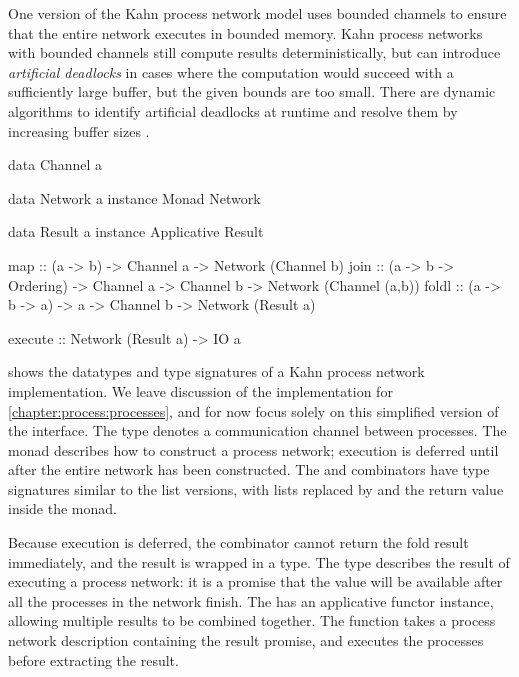 One version of the Kahn process network model uses bounded channels to ensure that the entire network executes in bounded memory.
Kahn process networks with bounded channels still compute results deterministically, but can introduce \emph{artificial deadlocks} in cases where the computation would succeed with a sufficiently large buffer, but the given bounds are too small.
There are dynamic algorithms to identify artificial deadlocks at runtime and resolve them by increasing buffer sizes \cite{parks1995bounded,geilen2003requirements}.


\begin{haskell}[float,caption=Types and combinators for Kahn process networks,label=figs/kpn/combinators]
data Channel a

data Network a
instance Monad Network

data Result  a
instance Applicative Result

map     :: (a -> b) -> Channel a
        -> Network (Channel b)
join    :: (a -> b -> Ordering) -> Channel a -> Channel b
        -> Network (Channel (a,b))
foldl   :: (a -> b -> a) -> a -> Channel b
        -> Network (Result a)

execute :: Network (Result a) -> IO a
\end{haskell}

 shows the datatypes and type signatures of a Kahn process network implementation.
We leave discussion of the implementation for \cref{chapter:process:processes}, and for now focus solely on this simplified version of the interface.
The \Hs@Channel@ type denotes a communication channel between processes.
The \Hs@Network@ monad describes how to construct a process network; execution is deferred until after the entire network has been constructed.
The \Hs@map@ and \Hs@join@ combinators have type signatures similar to the list versions, with lists replaced by \Hs@Channel@s and the return value inside the \Hs@Network@ monad.

Because execution is deferred, the \Hs@foldl@ combinator cannot return the fold result immediately, and the result is wrapped in a \Hs@Result@ type.
The \Hs@Result@ type describes the result of executing a process network: it is a promise that the value will be available after all the processes in the network finish.
The \Hs@Result@ has an applicative functor instance, allowing multiple results to be combined together.
The \Hs@execute@ function takes a process network description containing the result promise, and executes the processes before extracting the result.



